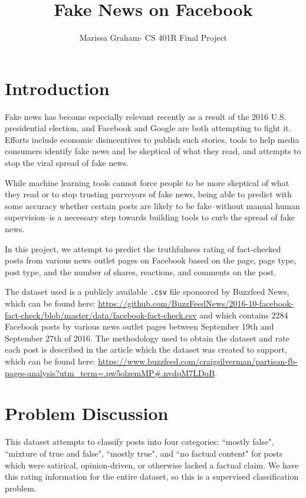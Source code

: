 \documentclass[12pt]{article}
\begin{document}
\title{Fake News on Facebook}
\author{Marissa Graham- CS 401R Final Project}

\maketitle

\section*{Introduction}

Fake news has become especially relevant recently as a result of the 2016 U.S. presidential election, and Facebook and Google are both attempting to fight it. Efforts include economic disincentives to publish such stories, tools to help media consumers identify fake news and be skeptical of what they read, and attempts to stop the viral spread of fake news.

While machine learning tools cannot force people to be more skeptical of what they read or to stop trusting purveyors of fake news, being able to predict with some accuracy whether certain posts are likely to be fake--without manual human supervision--is a necessary step towards building tools to curb the spread of fake news.

In this project, we attempt to predict the truthfulness rating of fact-checked posts from various news outlet pages on Facebook based on the page, page type, post type, and the number of shares, reactions, and comments on the post.

The dataset used is a publicly available \texttt{.csv} file sponsored by Buzzfeed News, which can be found here: \url{https://github.com/BuzzFeedNews/2016-10-facebook-fact-check/blob/master/data/facebook-fact-check.csv} and which contains 2284 Facebook posts by various news outlet pages between September 19th and September 27th of 2016. The methodology used to obtain the dataset and rate each post is described in the article which the dataset was created to support, which can be found here: \url{https://www.buzzfeed.com/craigsilverman/partisan-fb-pages-analysis?utm_term=.pw5olzemMP#.nvdpM7LDqB}.


\section*{Problem Discussion}

This dataset attempts to classify posts into four categories: ``mostly false", ``mixture of true and false", ``mostly true", and ``no factual content" for posts which were satirical, opinion-driven, or otherwise lacked a factual claim. We have this rating information for the entire dataset, so this is a supervised classification problem. 
\end{document}
